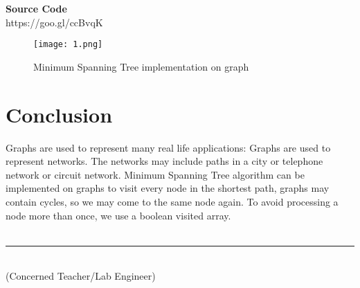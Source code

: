 \documentclass[11pt]{article}            %
\newcommand\tab[1][1cm]{\hspace*{#1}}
\begin{document}
\textbf{Source Code} \\
https://goo.gl/ccBvqK

\begin{figure}[b!]
\centering
  \texttt{[image: 1.png]}
\caption{Minimum Spanning Tree implementation on graph}
\label{Figure:1}    
\end{figure}

\section{Conclusion}
\justify Graphs are used to represent many real life applications: Graphs are used to represent networks. The networks may include paths in a city or telephone network or circuit network. Minimum Spanning Tree algorithm can be implemented on graphs to visit every node in the shortest path, graphs may contain cycles, so we may come to the same node again. To avoid processing a node more than once, we use a boolean visited array.\\~\\

\tab[6cm] \noindent\rule{6cm}{0.4pt}\\
\tab[6cm] (Concerned Teacher/Lab Engineer)


 
\end{document}
